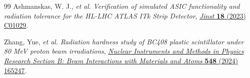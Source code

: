 \documentclass[a4paper,11pt]{article}
\begin{document}
\begin{thebibliography}{99}
Ashmanskas, W. J., \textit{et al.}
\emph{Verification of simulated ASIC functionality and radiation tolerance for the HL-LHC ATLAS ITk Strip Detector},
\href{https://iopscience.iop.org/article/10.1088/1748-0221/18/01/C01029}{\emph{Jinst} {\bf 18} (2023) C01029}.

Zhang, Yue, \textit{et al.}
\emph{Radiation hardness study of BC408 plastic scintillator under 80 MeV proton beam irradiations},
\href{https://www.sciencedirect.com/science/article/pii/S0168583X24000168}{\emph{Nuclear Instruments and Methods in Physics Research Section B: Beam Interactions with Materials and Atoms} {\bf 548} (2024) 165247}.









\end{thebibliography}
\end{document}
